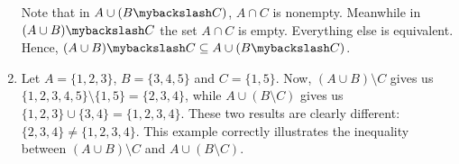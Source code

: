 \begin{enumerate}[label=(\alph*)]

    Note that in $A \cup (B \mybackslash C)$, $A \cap C$ is nonempty. Meanwhile in $(A \cup B) \mybackslash C$ the set $A \cap C$ is empty. Everything else is equivalent. Hence, $(A \cup B) \mybackslash C \subseteq A \cup (B \mybackslash C)$.
    
    \item Let $A=\{1,2,3\}$, $B=\{3,4,5\}$ and $C=\{1,5\}$. Now, $(A \cup B) \setminus C$ gives us $\{1, 2, 3, 4, 5\} \setminus \{1, 5\} = \{2, 3, 4\}$, while $A \cup (B \setminus C)$ gives us $\{1, 2, 3\} \cup \{3, 4\} = \{1, 2, 3, 4\}$. These two results are clearly different: $\{2, 3, 4\} \neq \{1, 2, 3, 4\}$. This example correctly illustrates the inequality between $(A \cup B) \setminus C$ and $A \cup (B \setminus C)$.
\end{enumerate}
\pagebreak